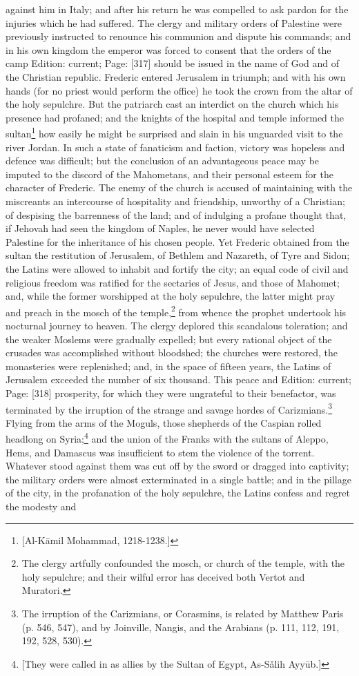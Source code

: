 against him in Italy; and after his return he was compelled to ask pardon for the injuries which he had suffered. The clergy and military orders of Palestine were previously instructed to renounce his communion and dispute his commands; and in his own kingdom the emperor was forced to consent that the orders of the camp Edition: current; Page: [317] should be issued in the name of God and of the Christian republic. Frederic entered Jerusalem in triumph; and with his own hands (for no priest would perform the office) he took the crown from the altar of the holy sepulchre. But the patriarch cast an interdict on the church which his presence had profaned; and the knights of the hospital and temple informed the sultan\footnote{[Al-Kāmil Mohammad, 1218-1238.]} how easily he might be surprised and slain in his unguarded visit to the river Jordan. In such a state of fanaticism and faction, victory was hopeless and defence was difficult; but the conclusion of an advantageous peace may be imputed to the discord of the Mahometans, and their personal esteem for the character of Frederic. The enemy of the church is accused of maintaining with the miscreants an intercourse of hospitality and friendship, unworthy of a Christian; of despising the barrenness of the land; and of indulging a profane thought that, if Jehovah had seen the kingdom of Naples, he never would have selected Palestine for the inheritance of his chosen people. Yet Frederic obtained from the sultan the restitution of Jerusalem, of Bethlem and Nazareth, of Tyre and Sidon; the Latins were allowed to inhabit and fortify the city; an equal code of civil and religious freedom was ratified for the sectaries of Jesus, and those of Mahomet; and, while the former worshipped at the holy sepulchre, the latter might pray and preach in the mosch of the temple,\footnote{The clergy artfully confounded the mosch, or church of the temple, with the holy sepulchre; and their wilful error has deceived both Vertot and Muratori.} from whence the prophet undertook his nocturnal journey to heaven. The clergy deplored this scandalous toleration; and the weaker Moslems were gradually expelled; but every rational object of the crusades was accomplished without bloodshed; the churches were restored, the monasteries were replenished; and, in the space of fifteen years, the Latins of Jerusalem exceeded the number of six thousand. This peace and Edition: current; Page: [318] prosperity, for which they were ungrateful to their benefactor, was terminated by the irruption of the strange and savage hordes of Carizmians.\footnote{The irruption of the Carizmians, or Corasmins, is related by Matthew Paris (p. 546, 547), and by Joinville, Nangis, and the Arabians (p. 111, 112, 191, 192, 528, 530).} Flying from the arms of the Moguls, those shepherds of the Caspian rolled headlong on Syria;\footnote{[They were called in as allies by the Sultan of Egypt, As-Sǎlih Ayyūb.]} and the union of the Franks with the sultans of Aleppo, Hems, and Damascus was insufficient to stem the violence of the torrent. Whatever stood against them was cut off by the sword or dragged into captivity; the military orders were almost exterminated in a single battle; and in the pillage of the city, in the profanation of the holy sepulchre, the Latins confess and regret the modesty and 